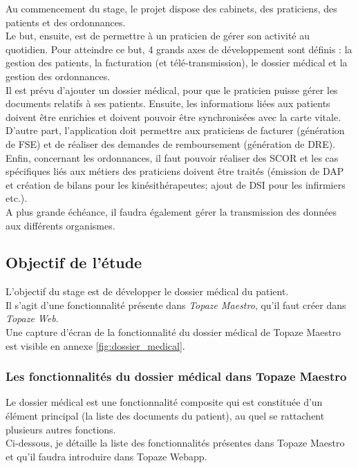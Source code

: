 Au commencement du stage, le projet dispose des cabinets, des praticiens, des patients et des ordonnances.\\

Le but, ensuite, est de permettre à un praticien de gérer son activité au quotidien. Pour atteindre ce but, 4 grands axes de développement sont définis : la gestion des patients, la facturation (et télé-transmission), le dossier médical et la gestion des ordonnances.\\

Il est prévu d'ajouter un dossier médical, pour que le praticien puisse gérer les documents relatifs à ses patients. Ensuite, les informations liées aux patients doivent être enrichies et doivent pouvoir être synchronisées avec la carte vitale. D'autre part, l'application doit permettre aux praticiens de facturer (génération de FSE) et de réaliser des demandes de remboursement (génération de DRE). Enfin, concernant les ordonnances, il faut pouvoir réaliser des SCOR et les cas spécifiques liés aux métiers des praticiens doivent être traités (émission de DAP et création de bilans pour les kinésithérapeutes; ajout de DSI pour les infirmiers etc.). \\

A plus grande échéance, il faudra également gérer la transmission des données aux différents organismes.

\subsection{Objectif de l'étude}

L'objectif du stage est de développer le dossier médical du patient.\\ 
Il s'agit d'une fonctionnalité présente dans \textit{Topaze Maestro}, qu'il faut créer dans \textit{Topaze Web}.\\
Une capture d'écran de la fonctionnalité du dossier médical de Topaze Maestro est visible en annexe \ref{fig:dossier_medical}.


\subsubsection{Les fonctionnalités du dossier médical dans Topaze Maestro}
Le dossier médical est une fonctionnalité composite qui est constituée d'un élément principal (la liste des documents du patient), au quel se rattachent plusieurs autres fonctions.\\
Ci-dessous, je détaille la liste des fonctionnalités présentes dans Topaze Maestro et qu'il faudra introduire dans Topaze Webapp.

